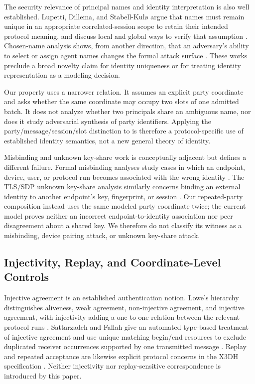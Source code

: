 The security relevance of principal names and identity interpretation is also
well established. Lupetti, Dillema, and Stabell-Kul\o{} argue that names must
remain unique in an appropriate correlated-session scope to retain their
intended protocol meaning, and discuss local and global ways to verify that
assumption \cite{lupetti2006names}. Chosen-name analysis shows, from another
direction, that an adversary's ability to select or assign agent names changes
the formal attack surface \cite{ceelen2008chosenname}. These works preclude a
broad novelty claim for identity uniqueness or for treating identity
representation as a modeling decision.

Our property uses a narrower relation. It assumes an explicit party coordinate
and asks whether the same coordinate may occupy two slots of one admitted
batch. It does not analyze whether two principals share an ambiguous name, nor
does it study adversarial synthesis of party identifiers. Applying the
party/message/session/slot distinction to \batchreceive is therefore a
protocol-specific use of established identity semantics, not a new general
theory of identity.

Misbinding and unknown key-share work is conceptually adjacent but defines a
different failure. Formal misbinding analyses study cases in which an endpoint,
device, user, or protocol run becomes associated with the wrong identity
\cite{sethi2019misbinding}. The TLS/SDP unknown key-share analysis similarly
concerns binding an external identity to another endpoint's key, fingerprint,
or session \cite{thomson2021uks}. Our repeated-party composition instead uses
the same modeled party coordinate twice; the current model proves neither an
incorrect endpoint-to-identity association nor peer disagreement about a
shared key. We therefore do not classify its witness as a misbinding, device
pairing attack, or unknown key-share attack.

\subsection{Injectivity, Replay, and Coordinate-Level Controls}

Injective agreement is an established authentication notion. Lowe's hierarchy
distinguishes aliveness, weak agreement, non-injective agreement, and
injective agreement, with injectivity adding a one-to-one relation between the
relevant protocol runs \cite{lowe1997hierarchy}. Sattarzadeh and Fallah give an
automated type-based treatment of injective agreement and use unique matching
begin/end resources to exclude duplicated receiver occurrences supported by
one transmitted message \cite{sattarzadeh2015injective}. Replay and repeated
acceptance are likewise explicit protocol concerns in the X3DH specification
\cite{marlinspike2016x3dh}. Neither injectivity nor replay-sensitive
correspondence is introduced by this paper.

